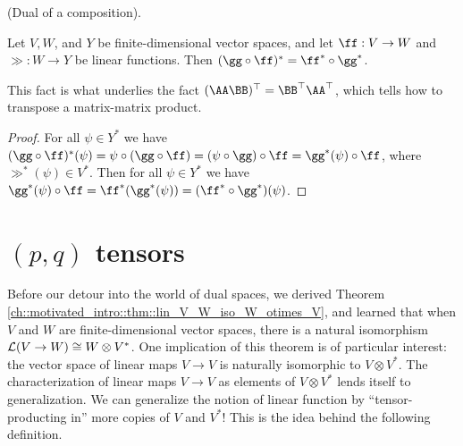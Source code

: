 \begin{theorem}
     (Dual of a composition).
     
     Let $V, W$, and $Y$ be finite-dimensional vector spaces, and let $\ff:V \rightarrow W$ and $\gg:W \rightarrow Y$ be linear functions. Then $(\gg \circ \ff)^* = \ff^* \circ \gg^*$. 
     
     This fact is what underlies the fact $(\AA \BB)^\top = \BB^\top \AA^\top$, which tells how to transpose a matrix-matrix product.
\end{theorem}

\begin{proof}
    For all $\psi \in Y^*$ we have $(\gg \circ \ff)^*(\psi) = \psi \circ (\gg \circ \ff) = (\psi \circ \gg) \circ \ff = \gg^*(\psi) \circ \ff$, where $\gg^*(\psi) \in V^*$. Then for all $\psi \in Y^*$ we have $\gg^*(\psi) \circ \ff = \ff^*(\gg^*(\psi)) = (\ff^* \circ \gg^*)(\psi)$.
\end{proof}

\newpage

\section{$(p, q)$ tensors}

Before our detour into the world of dual spaces, we derived Theorem \ref{ch::motivated_intro::thm::lin_V_W_iso_W_otimes_V}, and learned that when $V$ and $W$ are finite-dimensional vector spaces, there is a natural isomorphism $\mathcal{L}(V \rightarrow W) \cong W \otimes V^*$. One implication of this theorem is of particular interest: the vector space of linear maps $V \rightarrow V$ is naturally isomorphic to $V \otimes V^*$. The characterization of linear maps $V \rightarrow V$ as elements of $V \otimes V^*$ lends itself to generalization. We can generalize the notion of linear function by ``tensor-producting in'' more copies of $V$ and $V^*$! This is the idea behind the following definition.

